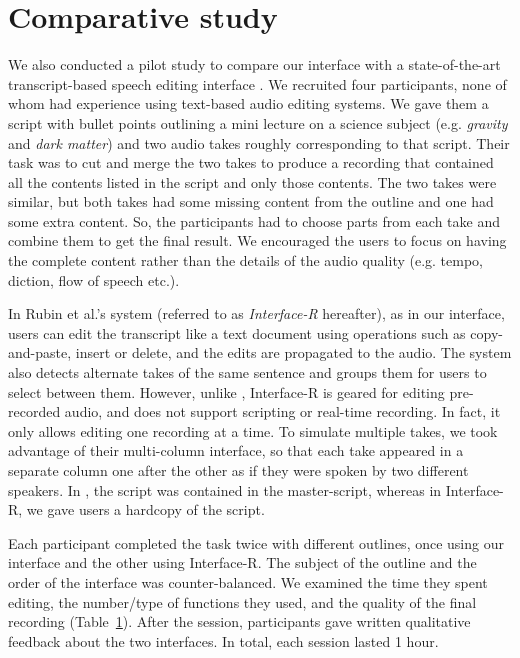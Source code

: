 \section{Comparative study}
We also conducted a pilot study to compare our interface with
a state-of-the-art transcript-based speech editing interface
\cite{rubin2013content}. We recruited four participants, none of whom had
experience using text-based audio editing systems. We gave them
a script with bullet points outlining a mini lecture on a science
subject (e.g. \textit{gravity} and \textit{dark matter}) and
two audio takes roughly corresponding to that script. Their task
was to cut and merge the two takes to produce a recording that
contained all the contents listed in the script and only those
contents. The two takes were similar, but both takes had some
missing content from the outline and one had some extra
content. So, the participants had to choose parts from each take
and combine them to get the final result. We encouraged the users
to focus on having the complete content rather than the details
of the audio quality (e.g. tempo, diction, flow of speech etc.).

In Rubin et al.'s system (referred to as
\textit{Interface-R} hereafter), as in our interface, users
can edit the transcript like a text document using operations
such as copy-and-paste, insert or delete, and the edits are propagated
to the audio. The system  also detects alternate takes of the
same sentence and groups them for users to select between them.
However, unlike \systemname , Interface-R is geared for editing pre-recorded
audio, and does not support scripting or real-time recording.
In fact, it only allows editing one recording at a time. To simulate multiple takes, we took advantage of their multi-column interface, so that each take appeared in a separate column one after the other as if they were spoken by two different speakers. In \systemname,  the script was contained in the master-script, whereas in Interface-R, we gave users a hardcopy of the script.

Each participant completed the task twice with different outlines,
once using our interface and the other using Interface-R.
The subject of the outline and the order of the interface was
counter-balanced. We examined the time they spent editing,
the number/type of functions they used, and the quality of the
final recording (Table~\ref{}). After the session, participants gave written
qualitative feedback about the two interfaces. In total, each
session lasted 1 hour.
   
